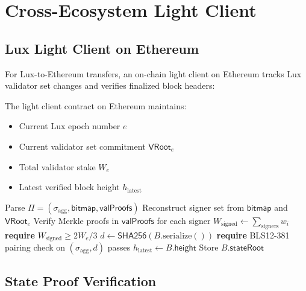 \section{Cross-Ecosystem Light Client}
\label{sec:lightclient}

\subsection{Lux Light Client on Ethereum}

For Lux-to-Ethereum transfers, an on-chain light client on Ethereum tracks Lux validator set changes and verifies finalized block headers:

\begin{definition}
The light client contract on Ethereum maintains:
\begin{itemize}
    \item Current Lux epoch number $e$
    \item Current validator set commitment $\mathsf{VRoot}_e$
    \item Total validator stake $W_e$
    \item Latest verified block height $h_{\text{latest}}$
\end{itemize}
\end{definition}

\begin{algorithm}[H]
\caption{Light Client Block Header Verification}
\label{alg:lightclient}
\begin{algorithmic}[1]
    \State Parse $\Pi = (\sigma_{\text{agg}}, \mathsf{bitmap}, \mathsf{valProofs})$
    \State Reconstruct signer set from $\mathsf{bitmap}$ and $\mathsf{VRoot}_e$
    \State Verify Merkle proofs in $\mathsf{valProofs}$ for each signer
    \State $W_{\text{signed}} \gets \sum_{\text{signers}} w_i$
    \State \textbf{require} $W_{\text{signed}} \geq 2W_e/3$
    \State $d \gets \mathsf{SHA256}(B.\text{serialize}())$
    \State \textbf{require} BLS12-381 pairing check on $(\sigma_{\text{agg}}, d)$ passes
    \State $h_{\text{latest}} \gets B.\mathsf{height}$
    \State Store $B.\mathsf{stateRoot}$
\EndProcedure
\end{algorithmic}
\end{algorithm}

\subsection{State Proof Verification}

